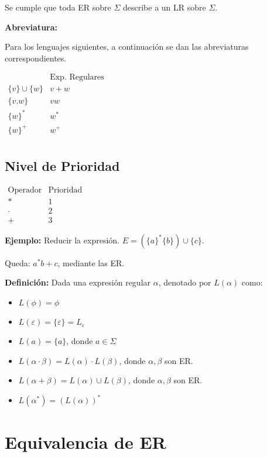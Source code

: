 Se cumple que toda ER sobre $\Sigma$ describe a un LR sobre $\Sigma$.

\textbf{Abreviatura: }

Para los lenguajes siguientes, a continuación se dan las abreviaturas correspondientes.

$\begin{array}{cc}
 & \mbox{Exp. Regulares} \\
\{v\}\cup \{w\} & v+w\\
\{v.w\} & vw\\
\{w\}^* & w^*\\
\{w\}^+ & w^+\\
\end{array}$

\subsection{Nivel de Prioridad}

$\begin{array}{cc}

\mbox{Operador} & \mbox{Prioridad} \\
* & 1 \\
\cdot & 2 \\
+ & 3
\end{array}$

\textbf{Ejemplo: }Reducir la expresión. $E=( \{ a\}^*\{b\} )\cup \{c\}$.

Queda: $a^*b+c$, mediante las ER.

\textbf{Definición: }Dada una expresión regular $\alpha$, denotado por $L(\alpha)$ como:

\begin{itemize}
\item $L(\phi)=\phi$
\item $L(\varepsilon)=\{\varepsilon\}=L_\varepsilon$
\item $L(a)=\{a\}$, donde $a\in\Sigma$
\item $L(\alpha \cdot \beta)= L(\alpha)\cdot L(\beta)$, donde $\alpha, \beta$ son ER.
\item $L(\alpha +\beta)=L(\alpha)\cup L(\beta)$, donde $\alpha, \beta$ son ER.
\item $L(\alpha^*)=(L(\alpha))^*$
\end{itemize}

\section{Equivalencia de ER}

